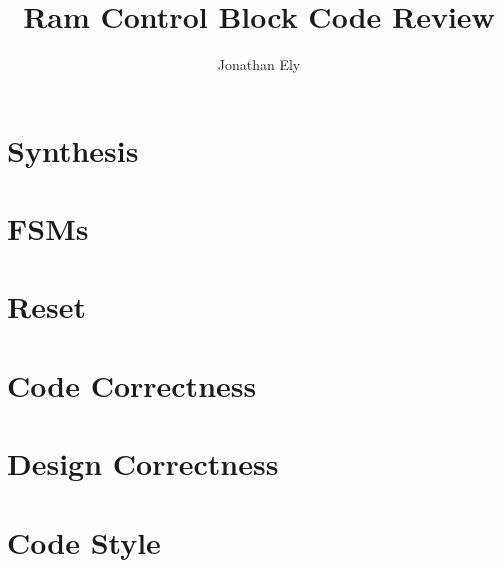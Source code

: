 \documentclass[11pt,a4paper]{article}
\title{Ram Control Block Code Review}
\author{Jonathan Ely}
\begin{document}


\maketitle
\section{Synthesis}

\section{FSMs}
\section{Reset}
\section{Code Correctness}
\section{Design Correctness}
\section{Code Style}
\end{document}
